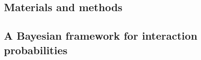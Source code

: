 \documentclass[12pt]{article}
\begin{document}
\begin{spacing}{2.0}
\section*{Materials and methods}

  \subsection*{A Bayesian framework for interaction probabilities}






  






\end{spacing}
\end{document}
